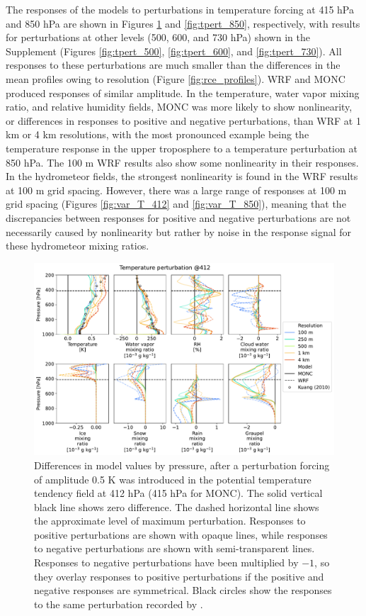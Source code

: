 \documentclass[draft]{agujournal2019}
\begin{document}
The responses of the models to perturbations in temperature forcing at 415 hPa
and 850 hPa are shown in Figures \ref{fig:tpert_412} and \ref{fig:tpert_850},
respectively, with results for perturbations at other levels (500, 600, and 730
hPa) shown in the Supplement (Figures \ref{fig:tpert_500}, \ref{fig:tpert_600},
and \ref{fig:tpert_730}). All responses to these perturbations are much smaller
than the differences in the mean profiles owing to resolution (Figure
\ref{fig:rce_profiles}). WRF and MONC produced responses of similar amplitude.
In the temperature, water vapor mixing ratio, and relative humidity fields, MONC
was more likely to show nonlinearity, or differences in responses to positive
and negative perturbations, than WRF at 1 km or 4 km resolutions, with the most
pronounced example being the temperature response in the upper troposphere to a
temperature perturbation at 850 hPa. The 100 m WRF results also show some
nonlinearity in their responses. In the hydrometeor fields, the strongest
nonlinearity is found in the WRF results at 100 m grid spacing. However, there
was a large range of responses at 100 m grid spacing (Figures
\ref{fig:var_T_412} and \ref{fig:var_T_850}), meaning that the discrepancies
between responses for positive and negative perturbations are not necessarily
caused by nonlinearity but rather by noise in the response signal for these
hydrometeor mixing ratios.

\begin{figure}[pth]
    \noindent\includegraphics[width=\textwidth]{figures/pert_diffs_T_0.5_@412}
    \caption{Differences in model values by pressure, after a perturbation
    forcing of amplitude 0.5 K was introduced in the potential temperature
    tendency field at 412 hPa (415 hPa for MONC). The solid vertical black line
    shows zero difference. The dashed horizontal line shows the approximate
    level of maximum perturbation. Responses to positive perturbations are shown
    with opaque lines, while responses to negative perturbations are shown with
    semi-transparent lines. Responses to negative perturbations have been
    multiplied by $-1$, so they overlay responses to positive perturbations if
    the positive and negative responses are symmetrical. Black circles show the
    responses to the same perturbation recorded by .}
    \label{fig:tpert_412}
\end{figure}
\end{document}
